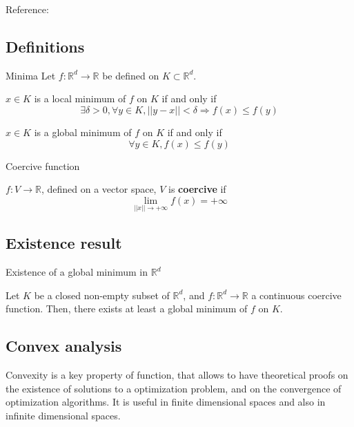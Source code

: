 \documentclass[
10pt, %
a4paper, %
oneside, %
headinclude,footinclude, %
BCOR5mm, %
]{scrartcl}
\begin{document}
Reference: \cite[]{Allaire2012} 

\subsection{\large\color{MidnightBlue}Definitions}

\begin{definition}{Minima}
    Let $f: \mathbb{R}^d\rightarrow \mathbb{R}$ be defined on $K\subset \mathbb{R}^d$.

    $x\in K$ is a local minimum of $f$ on $K$ if and only if
    \begin{equation*}
	\exists \delta>0, \forall y\in K, ||y-x||<\delta \Rightarrow f(x)\leq f(y)
    \end{equation*}

    $x\in K$ is a global minimum of $f$ on $K$ if and only if
    \begin{equation*}
	\forall y\in K, f(x)\leq f(y)
    \end{equation*}
\end{definition}

\begin{definition}{Coercive function}

    $f:V\rightarrow \mathbb{R} $, defined on a vector space, $V$ is \textbf{{coercive}} if 
    \begin{equation*}
	\lim_{||x||\rightarrow +\infty}f(x)=+\infty
    \end{equation*}
\end{definition}

\subsection{\large\color{MidnightBlue}Existence result}

\begin{theorem}{Existence of a global minimum in $\mathbb{R}^d$}

    Let $K$ be a closed non-empty subset of $ \mathbb{R}^d$, and $f: \mathbb{R}^d\rightarrow \mathbb{R} $ a continuous coercive function. Then, there exists at least a global minimum of $f$ on $K$.
\end{theorem}

\subsection{\large\color{MidnightBlue}Convex analysis}

Convexity is a key property of function, that allows to have theoretical proofs on the existence of solutions to a optimization problem, and on the convergence of optimization algorithms. It is useful in finite dimensional spaces and also in infinite dimensional spaces.
\end{document}
